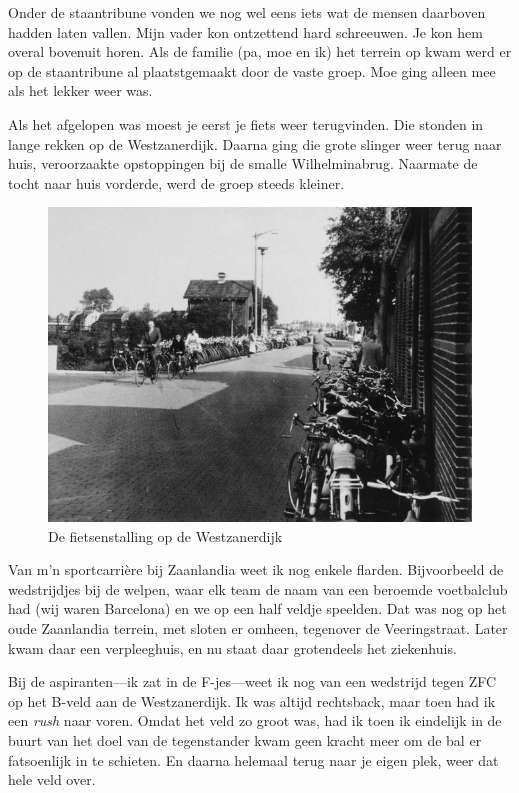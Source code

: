 \documentclass[10pt,twoside, openright]{memoir}
\begin{document}
Onder de staantribune vonden we nog wel eens iets wat de mensen daarboven hadden laten vallen. Mijn vader kon ontzettend hard schreeuwen. Je kon hem overal bovenuit horen. Als de familie (pa, moe en ik) het terrein op kwam werd er op de staantribune al plaatstgemaakt door de vaste groep. Moe ging alleen mee als het lekker weer was. 

Als het afgelopen was moest je eerst je fiets weer terugvinden. Die stonden in lange rekken op de Westzanerdijk. Daarna ging die grote slinger weer terug naar huis, veroorzaakte opstoppingen bij de smalle Wilhelminabrug. Naarmate de tocht naar huis vorderde, werd de groep steeds kleiner. 

\begin{figure}
\includegraphics[width=\textwidth]{img/75zfc2}
\caption*{\footnotesize De fietsenstalling op de Westzanerdijk}
\end{figure}

Van m’n sportcarrière bij Zaanlandia weet ik nog enkele flarden. Bijvoorbeeld de wedstrijdjes bij de welpen, waar elk team de naam van een beroemde voetbalclub had (wij waren Barcelona) en we op een half veldje speelden. Dat was nog op het oude Zaanlandia terrein, met sloten er omheen, tegenover de Veeringstraat. Later kwam daar een verpleeghuis, en nu staat daar grotendeels het ziekenhuis.

Bij de aspiranten---ik zat in de F-jes---weet ik nog van een wedstrijd tegen ZFC op het B-veld aan de Westzanerdijk. Ik was altijd rechtsback, maar toen had ik een \emph{rush} naar voren. Omdat het veld zo groot was, had ik toen ik eindelijk in de buurt van het doel van de tegenstander kwam geen kracht meer om de bal er fatsoenlijk in te schieten. En daarna helemaal terug naar je eigen plek, weer dat hele veld over. 
\end{document}
